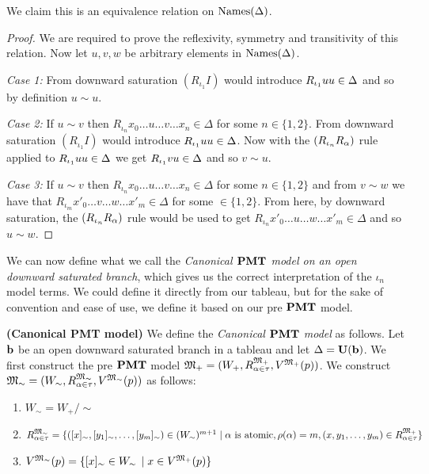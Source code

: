\par We claim this is an equivalence relation on $\text{Names}(\Delta)$.

\begin{proof}
    \par We are required to prove the reflexivity, symmetry and transitivity of this relation. Now let $u,v,w$ be arbitrary elements in $\text{Names}(\Delta)$.
    \par \textit{Case 1:} From downward saturation $(R_{\iota_1}I)$ would introduce $R_{\iota_{1}}uu\in\Delta$ and so by definition $u\sim u$.
    \par \textit{Case 2:} If $u\sim v$ then $R_{\iota_n}x_0\ldots u \ldots v \ldots x_n\in\Delta$ for some $n\in\{1,2\}$. From downward saturation $(R_{\iota_1}I)$ would introduce $R_{\iota_{1}}uu\in\Delta$. Now with the $(R_{\iota_n} R_\alpha)$ rule applied to $R_{\iota_{1}}uu\in\Delta$ we get $R_{\iota_{1}}vu\in\Delta$ and so $v\sim u$.
    \par \textit{Case 3:} If $u\sim v$ then $R_{\iota_n}x_0\ldots u \ldots v \ldots x_n\in\Delta$ for some $n\in\{1,2\}$ and from $v\sim w$ we have that $R_{\iota_m}x'_0\ldots v \ldots w  \ldots x'_m\in\Delta$ for some $\in\{1,2\}$. From here, by downward saturation, the $(R_{\iota_n} R_\alpha)$ rule would be used to get $R_{\iota_n}x'_0\ldots u \ldots w  \ldots x'_m\in\Delta$ and so $u\sim w$.
\end{proof}


\par We can now define what we call the \textit{Canonical $\textbf{PMT}$ model on an open downward saturated branch}, which gives us the correct interpretation of the $\iota_n$ model terms. We could define it directly from our tableau, but for the sake of convention and ease of use, we define it based on our pre $\textbf{PMT}$ model.
 

\begin{definition}\label{canonical flt model}
    \par \textbf{(Canonical PMT model)} We define the \textit{Canonical $\textbf{PMT}$ model} as follows. Let $\textbf{b}$ be an open downward saturated branch in a tableau and let $\Delta=\textbf{U}(\textbf{b})$. We first construct the pre $\textbf{PMT}$ model ${\mathfrak{M}_+} = (W_+, R_{\alpha\in\tau}^{\mathfrak{M}_+}, V^{\mathfrak{M}_+}(p))$. We construct ${\mathfrak{M}_\sim} = (W_\sim,R^{\mathfrak{M}_\sim}_{\alpha\in\tau},V^{\mathfrak{M}_\sim}(p))$ as follows:
    \begin{enumerate}
        \item $W_\sim=W_+/\sim$
        \item $R^{\mathfrak{M}_\sim}_{\alpha\in\tau} = \{([x]_\sim,[y_1]_\sim,\ldots,[y_m]_\sim) \in (W_\sim)^{m+1} \mid \alpha \text{ is atomic}, \rho(\alpha)=m, (x,y_1,\ldots,y_{m})\in R^{\mathfrak{M}_+}_{\alpha\in\tau} \}$
        \item $V^{\mathfrak{M}_\sim} (p) = \{[x]_\sim\in W_\sim\,\mid x\in V^{\mathfrak{M}_+}(p)\}$
    \end{enumerate}
\end{definition}

